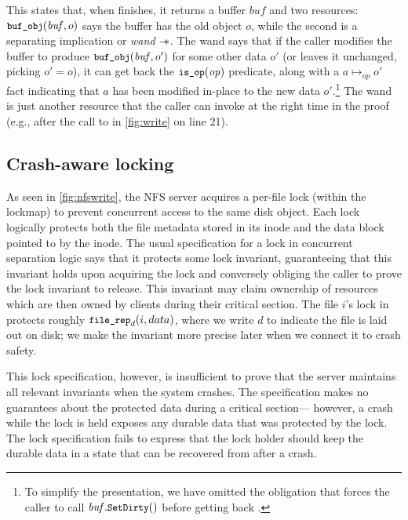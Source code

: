 This states that, when  finishes, it returns a buffer $\mathit{buf}$
and two resources: $\cc{buf_obj}(\mathit{buf}, o)$ says the buffer has the old
object $o$, while the second is a separating implication or \emph{wand} $\mathrel{-\!\!\ast}$.
The wand says that if
the caller modifies the buffer to produce $\cc{buf_obj}(\mathit{buf}, o')$ for
some other data $o'$ (or leaves it unchanged, picking $o' = o$), it can get back
the $\cc{is_op}(\mathit{op})$ predicate, along with a
$a \mapsto_{\mathit{op}} o'$ fact indicating that $a$ has been modified in-place
to the new data $o'$.\footnote{To simplify the presentation, we have omitted
the obligation that forces the caller to call $\mathit{buf}.\cc{SetDirty}()$
before getting back .} The wand is just another resource that the
caller can invoke at the right time in the proof (e.g., after the call to
 in \cref{fig:write} on line 21).

\subsection{Crash-aware locking}
\label{s:design:crashlock}

As seen in \cref{fig:nfswrite}, the NFS server acquires a per-file lock
(within the lockmap) to prevent concurrent access to the same disk object.
Each lock
logically protects both the file metadata stored in its inode and the data block pointed
to by the inode. The usual specification for a lock
in concurrent separation logic says
that it protects some lock invariant, guaranteeing that this
invariant holds upon acquiring the lock and conversely obliging the caller to
prove the lock invariant to release.
This invariant may claim ownership of resources which are then owned by clients during their critical section.
The file $i$'s lock in \simplenfs protects
roughly $\cc{file_rep}_{d}(i, data)$, where we write $d$ to indicate the file is
laid out on disk; we make the invariant more precise later when we connect it to
crash safety.

This lock specification, however, is insufficient to prove that the \simplenfs server maintains all relevant invariants when the system crashes.
The specification makes no guarantees about the protected data during
a critical section---%
however, a crash while the lock is held exposes any durable data that
was protected by the lock. The lock specification fails to express that the lock
holder should keep the durable data in a state that can be recovered from after a crash.

